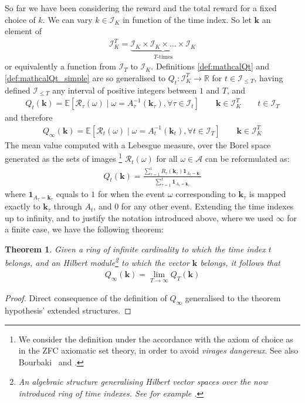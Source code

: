 \documentclass[]{scrartcl}
\newtheorem{theorem}{Theorem}[section]
\theoremstyle{definition}
\begin{document}
So far we have been considering the reward and the total reward for a fixed choice of $k$. We can vary $k\in \mathcal{I}_K$ in function of the time index. So let $\mathbf{k}$ an element of
\begin{align*}
\mathcal{I}_K^T = \underbrace{\mathcal{I}_K\times \mathcal{I}_K \times \dots \times \mathcal{I}_K}_{T\text{-times}}
\end{align*}
or equivalently a function from $\mathcal{I}_T$ to $\mathcal{I}_K$.
Definitions \ref{def:mathcalQt} and \ref{def:mathcalQt_simple} are so generalised to $Q_t:\mathcal{I}_K^T \rightarrow \mathbb{R}$ for $t\in\mathcal{I}_{\leq T}$, having defined $\mathcal{I}_{\leq T}$ any interval of positive integers between $1$ and $T$, and
\begin{align*}
Q_t(\mathbf{k}) = \mathbb{E} \left[ \mathcal{R}_{\tau}(\omega)
\mid
\omega = A^{-1}_{\tau}(\mathbf{k}_{\tau}), \forall \tau \in \mathcal{I}_t \right]
\qquad
\mathbf{k} \in \mathcal{I}_K^T
\qquad
t \in \mathcal{I}_T
\end{align*}
and therefore
\begin{align*}
Q_{\infty}(\mathbf{k}) = \mathbb{E} \left[ \mathcal{R}_{t}(\omega)
\mid
\omega = A^{-1}_{t}(\mathbf{k}_{t}),  \forall t \in \mathcal{I}_T \right]
\qquad
\mathbf{k} \in \mathcal{I}_K^T
\end{align*}
The mean value computed with a Lebesgue measure, over the Borel space generated as the sets of images
\footnote{
    We consider the definition under the accordance with the axiom of choice as in the ZFC axiomatic set theory, in order to avoid \emph{virages dangereux}. See also Bourbaki~\cite{bourbaki2004theory} and \cite{takeuti1982classes}.
} $\mathcal{R}_t(\omega)$ for all $\omega \in \mathcal{A}$ can be reformulated as:
\begin{align*}
Q_t(\mathbf{k})
=
\frac
{\sum_{\tau=1}^{t} R_{\tau}(\mathbf{k}_{\tau}) \mathbf{1}_{A_\tau = \mathbf{k}_{\tau}}}
{\sum_{\tau=1}^{t} \mathbf{1}_{A_\tau = \mathbf{k}_{\tau}}}
\end{align*}
where $\mathbf{1}_{A_\tau = \mathbf{k}_{\tau}}$ equals to $1$ for when the event $\omega$ corresponding to $\mathbf{k}_{\tau}$ is mapped exactly to $\mathbf{k}_{\tau}$ through $A_t$, and $0$ for any other event.
Extending the time indexes up to infinity, and to justify the notation introduced above, where we used $\infty$ for a finite case, we have the following theorem:
\begin{theorem}\label{th:bourbaki}
Given a ring of infinite cardinality to which the time index $t$ belongs, and an Hilbert module\footnote{An algebraic structure generalising Hilbert vector spaces over the now introduced ring of time indexes. See for example \cite{bourbaki1987topological}.} to which the vector $\mathbf{k}$ belongs, it follows that
\begin{align*}
Q_{\infty}(\mathbf{k}) = \lim_{T \rightarrow \infty} Q_{T}(\mathbf{k})
\end{align*}
\end{theorem}
\begin{proof}
    Direct consequence of the definition of $Q_{\infty}$ generalised to the theorem hypothesis' extended structures.
\end{proof}
\end{document}
